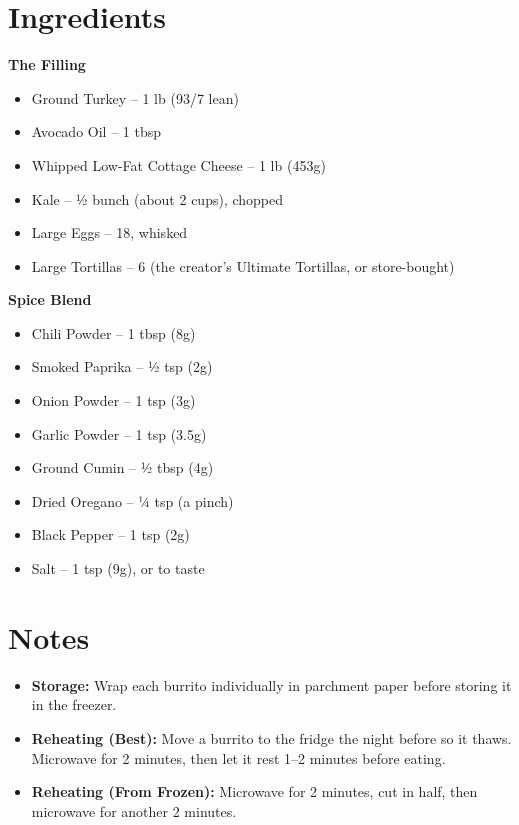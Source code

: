




\section*{Ingredients}

\textbf{The Filling}
\begin{itemize}[itemsep=0.1em, label={\raisebox{-0.1ex}{\large\textbullet}}]
      \item Ground Turkey – 1 lb (93/7 lean)
      \item[\measure] Avocado Oil – 1 tbsp
      \item Whipped Low-Fat Cottage Cheese – 1 lb (453g)
      \item[\cut] Kale – ½ bunch (about 2 cups), chopped
      \item Large Eggs – 18, whisked
      \item Large Tortillas – 6 (the creator's Ultimate Tortillas, or store-bought)
\end{itemize}

\textbf{Spice Blend}
\begin{itemize}[itemsep=0.1em, label={\raisebox{-0.1ex}{\large\textbullet}}]
      \item[\measure] Chili Powder – 1 tbsp (8g)
      \item[\measure] Smoked Paprika – ½ tsp (2g)
      \item[\measure] Onion Powder – 1 tsp (3g)
      \item[\measure] Garlic Powder – 1 tsp (3.5g)
      \item[\measure] Ground Cumin – ½ tbsp (4g)
      \item[\measure] Dried Oregano – ¼ tsp (a pinch)
      \item[\measure] Black Pepper – 1 tsp (2g)
      \item[\measure] Salt – 1 tsp (9g), or to taste
\end{itemize}

\section*{Notes}

\begin{itemize}
      \item \textbf{Storage:} Wrap each burrito individually in parchment paper before storing it in the freezer.
      \item \textbf{Reheating (Best):} Move a burrito to the fridge the night before so it thaws. Microwave for 2 minutes, then let it rest 1--2 minutes before eating.
      \item \textbf{Reheating (From Frozen):} Microwave for 2 minutes, cut in half, then microwave for another 2 minutes.
\end{itemize}

